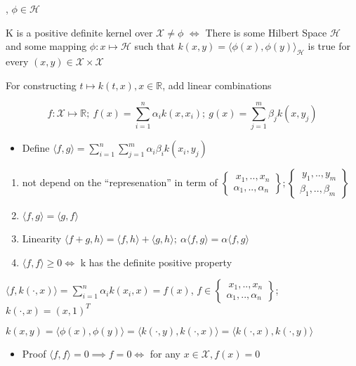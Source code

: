 \documentclass[10pt,portrait]{article}
\providecommand{\tightlist}{%
  \setlength{\itemsep}{0pt}\setlength{\parskip}{0pt}}
\begin{document}
, \(\phi\in\mathcal{H}\)

K is a positive definite kernel over \(\mathcal{X}\neq\phi\) \(\iff\)
There is some Hilbert Space \(\mathcal{H}\) and some mapping
\(\phi: x\mapsto\mathcal{H}\) such that
\(k(x,y)=\langle\phi(x),\phi(y)\rangle_{\mathcal{H}}\) is true for every
\((x,y)\in \mathcal{X}\times\mathcal{X}\)

For constructing \(t\mapsto k(t,x), x\in\mathbb{R}\), add linear
combinations

\[f:\mathcal{X}\mapsto\mathbb{R};\ f(x)=\sum_{i=1}^n\alpha_ik(x,x_i);\ g(x)=\sum_{j=1}^m\beta_jk(x,y_j)\]

\begin{itemize}
\tightlist
\item
  Define
  \(\langle f,g\rangle=\sum_{i=1}^n\sum_{j=1}^m\alpha_i\beta_ik(x_i,y_j)\)
\end{itemize}

\begin{enumerate}
\def\labelenumi{\arabic{enumi}.}
\item
  not depend on the ``represenation'' in term of
  \(\begin{Bmatrix}\ x_1,..,x_n\\\alpha_1,..,\alpha_n\end{Bmatrix}; \begin{Bmatrix}\ y_1,..,y_m\\\beta_1,..,\beta_m\end{Bmatrix}\)
\item
  \(\langle f,g\rangle=\langle g,f\rangle\)
\item
  Linearity
  \(\langle f+g,h\rangle=\langle f,h\rangle+\langle g,h\rangle;\ \alpha\langle f,g\rangle=\alpha\langle f,g\rangle\)
\item
  \(\langle f,f\rangle\ge0\iff\) k has the definite positive property
\end{enumerate}

\(\langle f,k(\cdot,x)\rangle=\sum_{i=1}^n\alpha_ik(x_i,x)=f(x)\),
\(f\in\begin{Bmatrix}\ x_1,..,x_n\\\alpha_1,..,\alpha_n\end{Bmatrix}\);
\(k(\cdot,x)=(x,1)^T\)

\(k(x,y)=\langle\phi(x),\phi(y)\rangle=\langle k(\cdot,y),k(\cdot,x)\rangle=\langle k(\cdot,x),k(\cdot,y)\rangle\)

\begin{itemize}
\tightlist
\item
  Proof \(\langle f,f\rangle=0\implies f=0\iff\) for any
  \(x\in\mathcal{X}, f(x)=0\)
\end{itemize}
\end{document}
